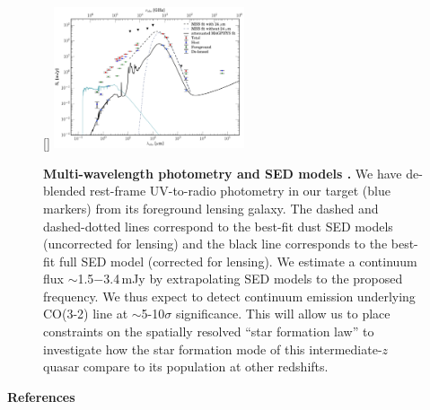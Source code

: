 \documentclass[11pt,a4paper,twoside,graphicx,color]{article}
\newcommand{\cco}{\mbox{CO(3-2)}\xspace}
\newcommand{\ssim}{\,$\sim$\,}
\newcommand{\SF}{star formation\xspace}
\newcommand{\interz}{intermediate-$z$\xspace}
\begin{document}
\begin{figure}[!htbp]
\vspace{-1.15em}
\hspace{-1.95em}
\centering
{}
[\FBwidth]
{
\includegraphics[trim=5 0 13 0, clip, angle=0,
width=0.50\textwidth]{Figures/FullSED_withMagphys}} 
{
\hspace{-0.95em}
\caption{ 
\textbf{Multi-wavelength photometry and SED models
\citep{Leung16b}.}
We have de-blended rest-frame UV-to-radio 
photometry in our target 
(blue markers) from its foreground lensing galaxy.
The dashed and dashed-dotted lines correspond to the best-fit dust 
SED models (uncorrected for lensing) 
and
the black line corresponds to the best-fit full SED model (corrected for lensing).
We estimate a continuum flux 
$\sim$1.5$-$3.4\,mJy
by extrapolating SED models to the proposed frequency.
We thus expect to detect continuum emission underlying \cco line at $\sim$5-10$\sigma$ significance.
This will allow us to place constraints on the spatially resolved 
``\SF law'' to investigate how the \SF mode of this \interz quasar compare to its population at other redshifts.
\label{fig:SED}}}
\vspace{-0.85em}
\end{figure}

\noindent \textbf{References}
{\fontsize{11pt}{11pt}\selectfont
	
}
\end{document}
